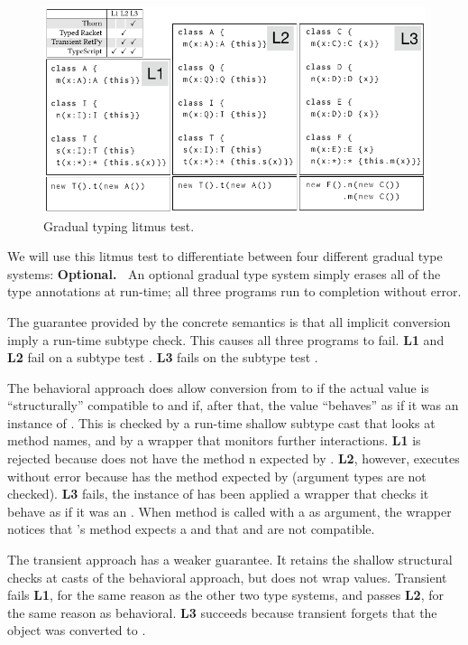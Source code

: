 \documentclass[USenglish]{tex/lipics-v2016}
\begin{document}
\begin{figure}[!h] \includegraphics[width=.95\columnwidth]{../figures/litm}
  \caption{Gradual typing litmus test.}\label{litmus}
\end{figure}

\noindent We will use this litmus test to differentiate between four different
gradual type systems:
\vspace{2mm}\noindent
{\bf Optional.~} An optional gradual type system simply erases all of the
type annotations at run-time; all three programs run to completion without
error.

\vspace{2mm} The guarantee provided by the
concrete semantics is that all implicit conversion imply a run-time subtype
check.  This causes all three programs to fail. {\bf L1} and
{\bf L2} fail on a subtype test \StrSub{}\K\A\I.  {\bf L3} fails on the
subtype test \StrSub{}\K\C\E.

\vspace{2mm} The behavioral approach does allow
conversion from \any to \C if the actual value is ``structurally''
compatible to \C and if, after that, the value ``behaves'' as if it was an
instance of \C.  This is checked by a run-time shallow subtype cast that
looks at method names, and by a wrapper that monitors further interactions.
{\bf L1} is rejected because \A does not have the method \xt n expected by
\I. {\bf L2}, however, executes without error because \A has the method \m
expected by \I (argument types are not checked). {\bf L3} fails, the
instance of \C has been applied a wrapper that checks it behave as if it was
an \E.  When method \a is called with a \C as argument, the wrapper notices
that \E's method \a expects a \D and that \C and \D are not compatible.

\vspace{2mm} The transient approach has a weaker
guarantee. It retains the shallow structural checks at casts of the
behavioral approach, but does not wrap values. Transient fails {\bf L1}, for
the same reason as the other two type systems, and passes {\bf L2}, for the
same reason as behavioral.  {\bf L3} succeeds because transient forgets that
the \C object was converted to \E.
\end{document}
